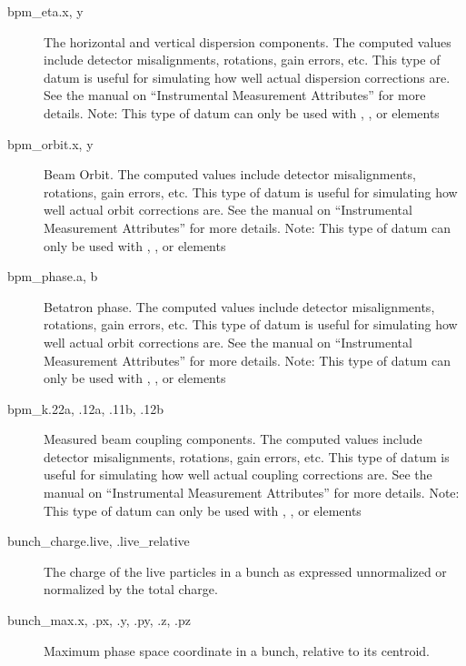 \begin{description}
  \item[bpm_eta.x, y] \Newline {}
The horizontal and vertical dispersion components. The computed  values include detector
misalignments, rotations, gain errors, etc. This type of datum is useful for simulating how well
actual dispersion corrections are. See the \bmad manual on ``Instrumental Measurement Attributes''
for more details.  Note: This type of datum can only be used with , ,
 or  elements

  \item[bpm_orbit.x, y] \Newline {}
Beam Orbit. The computed  values include detector misalignments, rotations, gain errors,
etc. This type of datum is useful for simulating how well actual orbit corrections are. See the
\bmad manual on ``Instrumental Measurement Attributes'' for more details.  Note: This type of datum
can only be used with , ,  or  elements

  \item[bpm_phase.a, b] \Newline {}
Betatron phase. The computed  values include detector misalignments, rotations, gain
errors, etc. This type of datum is useful for simulating how well actual orbit corrections are. See
the \bmad manual on ``Instrumental Measurement Attributes'' for more details.  Note: This type of
datum can only be used with , ,  or  elements

  \item[bpm_k.22a, .12a, .11b, .12b] \Newline {}
Measured beam coupling components. The computed  values include detector misalignments,
rotations, gain errors, etc. This type of datum is useful for simulating how well actual coupling
corrections are. See the \bmad manual on ``Instrumental Measurement Attributes'' for more details.
Note: This type of datum can only be used with , ,  or
 elements

  \item[bunch_charge.live, .live_relative] \Newline {}
The charge of the live particles in a bunch as expressed unnormalized or normalized by the total charge.

  \item[bunch_max.x, .px, .y, .py, .z, .pz] \Newline {}
Maximum phase space coordinate in a bunch, relative to its centroid.


\end{description}
